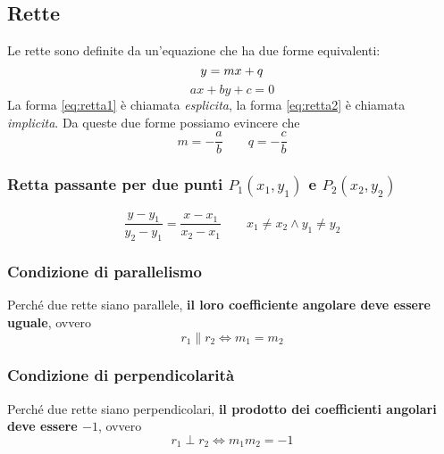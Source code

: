 \subsection{Rette}\label{subsec:geomanal:retta}
\begin{center}
\end{center}
Le rette sono definite da un'equazione che ha due forme equivalenti:
\begin{equation}\label{eq:retta1}
y = mx + q\\
\end{equation}
\begin{equation}\label{eq:retta2}
ax + by + c = 0
\end{equation}
La forma \eqref{eq:retta1} è chiamata \emph{esplicita}, la forma \eqref{eq:retta2} è chiamata 
\emph{implicita}. Da queste due forme possiamo evincere che
\begin{equation*}
m = -\frac{a}{b} \qquad q = -\frac{c}{b}
\end{equation*}
\setcounter{equation}{0}

\subsubsection{Retta passante per due punti $P_1(x_1,y_1)$ e $P_2(x_2,y_2)$}
\begin{equation*}
\frac{y-y_1}{y_2-y_1}=\frac{x-x_1}{x_2-x_1} \qquad x_1\neq x_2 \land y_1\neq y_2
\end{equation*}

\subsubsection{Condizione di parallelismo}
Perché due rette siano parallele, \textbf{il loro coefficiente angolare deve essere uguale}, ovvero
\begin{equation*}
r_1 \| r_2 \iff m_1=m_2
\end{equation*}

\subsubsection{Condizione di perpendicolarità}
Perché due rette siano perpendicolari, \textbf{il prodotto dei coefficienti angolari deve essere $-1$},
ovvero
\begin{equation*}
r_1 \perp r_2 \iff m_1m_2 = -1
\end{equation*}

